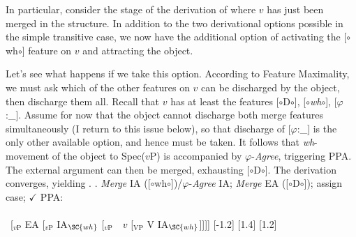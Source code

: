 \documentclass[11pt, letterpaper]{paper_nick}
\newcommand{\fm}[1]{[$\circ$#1$\circ$]}
\begin{document}
In particular, consider the stage of the derivation of \Last where $v$ has just been merged in the structure. In addition to the two derivational options possible in the simple transitive case, we now have the additional option of activating the \fm{wh} feature on $v$ and attracting the object. 

Let's see what happens if we take this option. According to Feature Maximality, we must ask which of the other features on $v$ can be discharged by the object, then discharge them all. Recall that $v$ has at least the features \fm{D}, \fm{\emph{wh}}, [$\varphi$:\_]. Assume for now that the object cannot discharge both merge features simultaneously (I return to this issue below), so that discharge of [$\varphi$:\_] is the only other available option, and hence must be taken. It follows that \emph{wh}-movement of the object to Spec($v$P) is accompanied by $\varphi$-\emph{Agree}, triggering PPA. The external argument can then be merged, exhausting \fm{D}. The derivation converges, yielding \Last[a].
\ex. \emph{Merge} IA (\fm{wh})/$\varphi$-\emph{Agree} IA; \emph{Merge} EA (\fm{D}); assign case; $\checkmark$ PPA:\\\\
\ [$_\text{$v$P}$ \hspace*{-.3cm}EA [$_\text{$v$P}$ \hspace*{-.3cm}IA$_\SC{wh}$ [$_\text{$v$P}$\ \ \hspace*{-.2cm}\hspace*{-.2cm}$v$ [$_\text{VP}$ V \hspace*{-.3cm}IA$_\SC{wh}$]]]]
[-1.2]
[1.4]
[1.2]\\
 
\end{document}
